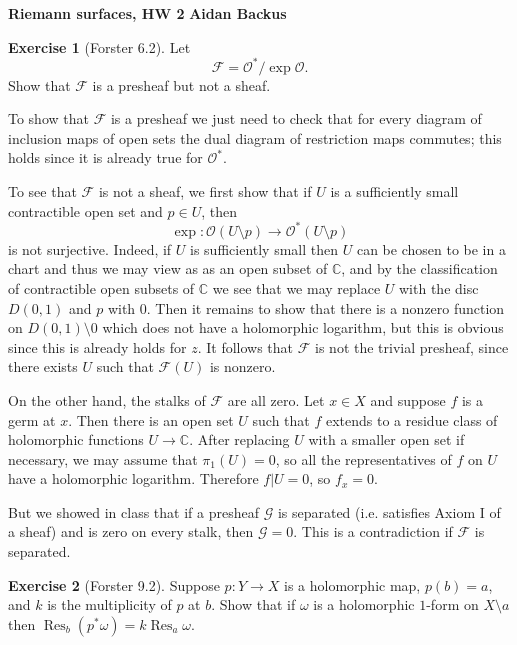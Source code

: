 \documentclass[10pt]{article}
\newcommand{\CC}{\mathbb{C}}
\DeclareMathOperator*{\Res}{Res}
\newcommand{\Olo}{\mathscr O}
\theoremstyle{definition}
\newtheorem{exer}{Exercise}
\begin{document}
\noindent
\large\textbf{Riemann surfaces, HW 2} \hfill \textbf{Aidan Backus} \\

\begin{exer}[Forster 6.2]
Let
$$\mathscr F = \Olo^*/\exp \Olo.$$
Show that $\mathscr F$ is a presheaf but not a sheaf.
\end{exer}

To show that $\mathscr F$ is a presheaf we just need to check that for every diagram of inclusion maps of open sets the dual diagram of restriction maps commutes; this holds since it is already true for $\Olo^*$.

To see that $\mathscr F$ is not a sheaf, we first show that if $U$ is a sufficiently small contractible open set and $p \in U$, then
$$\exp: \Olo(U \setminus p) \to \Olo^*(U \setminus p)$$
is not surjective. Indeed, if $U$ is sufficiently small then $U$ can be chosen to be in a chart and thus we may view as as an open subset of $\CC$, and by the classification of contractible open subsets of $\CC$ we see that we may replace $U$ with the disc $D(0, 1)$ and $p$ with $0$.
Then it remains to show that there is a nonzero function on $D(0, 1) \setminus 0$ which does not have a holomorphic logarithm, but this is obvious since this is already holds for $z$.
It follows that $\mathscr F$ is not the trivial presheaf, since there exists $U$ such that $\mathscr F(U)$ is nonzero.

On the other hand, the stalks of $\mathscr F$ are all zero.
Let $x \in X$ and suppose $f$ is a germ at $x$.
Then there is an open set $U$ such that $f$ extends to a residue class of holomorphic functions $U \to \CC$.
After replacing $U$ with a smaller open set if necessary, we may assume that $\pi_1(U) = 0$, so all the representatives of $f$ on $U$ have a holomorphic logarithm.
Therefore $f|U = 0$, so $f_x = 0$.

But we showed in class that if a presheaf $\mathscr G$ is separated (i.e. satisfies Axiom I of a sheaf) and is zero on every stalk, then $\mathscr G = 0$.
This is a contradiction if $\mathscr F$ is separated.

\begin{exer}[Forster 9.2]
Suppose $p: Y \to X$ is a holomorphic map, $p(b) = a$, and $k$ is the multiplicity of $p$ at $b$. Show that if $\omega$ is a holomorphic $1$-form on $X \setminus a$ then $\Res_b(p^*\omega) = k \Res_a \omega$.
\end{exer}
\end{document}

